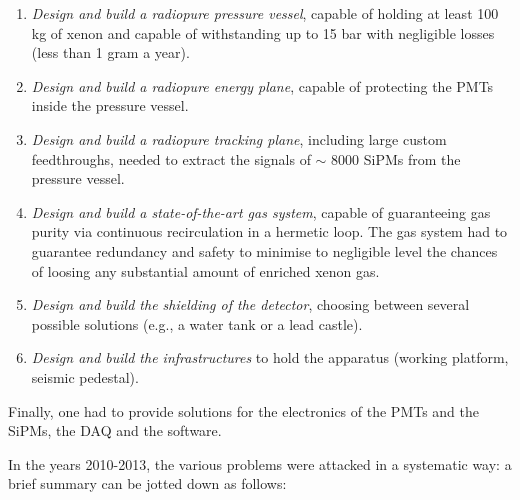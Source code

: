 \begin{enumerate}
\item{\em Design and build a radiopure pressure vessel}, capable of holding at least 100 kg of xenon and capable of withstanding up to 15 bar with negligible losses (less than 1 gram a year). 
\item{\em Design and build a radiopure energy plane}, capable of protecting the PMTs inside the pressure vessel.
\item{\em Design and build a radiopure tracking plane}, including large custom feedthroughs, needed to extract the signals of $\sim$ 8000 SiPMs from the pressure vessel. 
\item{\em Design and build a state-of-the-art gas system}, capable of guaranteeing gas purity via continuous recirculation in a hermetic loop. The gas system had to guarantee redundancy and safety to minimise to negligible level the chances of loosing any substantial amount of enriched xenon gas. 
\item{\em Design and build the shielding of the detector}, choosing between several possible solutions (e.g., a water tank or a lead castle).
\item{\em Design and build the infrastructures} to hold the apparatus (working platform, seismic pedestal).
\end{enumerate}

Finally, one had to provide solutions for the electronics of the PMTs and the SiPMs, the  DAQ and the software.

In the years 2010-2013, the various problems were attacked in a systematic way: a brief summary can be jotted down as follows:

